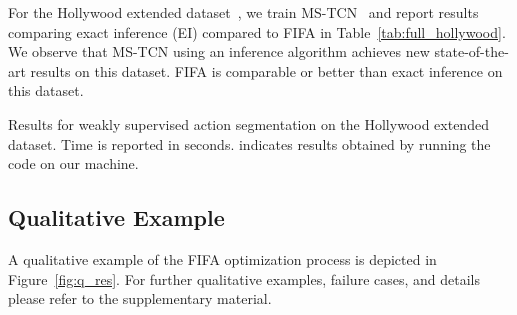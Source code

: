 For the Hollywood extended dataset~\cite{hollywoodextended}, we train MS-TCN~\cite{MS-TCN} and report results comparing exact inference (EI) compared to FIFA in Table~\ref{tab:full_hollywood}. We observe that MS-TCN using an inference algorithm achieves new state-of-the-art results on this dataset. FIFA is comparable or better than exact inference on this dataset.



\begin{table}
   \begin{minipage}{0.48\textwidth}
      \centering
      \caption{Results for weakly supervised action segmentation on the Hollywood extended dataset. Time is reported in seconds.  indicates results obtained by running the code on our machine.}
      \label{tab:weak_hollywood}
   \end{minipage}\hfill
   \begin{minipage}{0.48\textwidth}
      \centering
      \caption{Results for fully supervised action segmentation on the Hollywood extended dataset. EI stands for Exact Inference.}
      \label{tab:full_hollywood}
   \end{minipage}
\end{table}

\subsection{Qualitative Example}



A qualitative example of the FIFA optimization process is depicted in Figure~\ref{fig:q_res}. For further qualitative examples, failure cases, and details please refer to the supplementary material.




%
